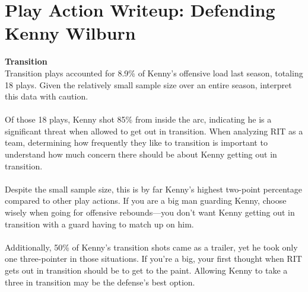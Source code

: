 \documentclass[a4paper,12pt]{article}
\begin{document}
\vspace{2em}

\section*{Play Action Writeup: Defending Kenny Wilburn}

\begin{multicols}{2}
    
    {\large \noindent \textbf{Transition}} \\ 
    Transition plays accounted for 8.9\% of Kenny's offensive load last season, totaling 18 plays. Given the relatively small sample size over an entire season, interpret this data with caution. \\ \\
    Of those 18 plays, Kenny shot 85\% from inside the arc, indicating he is a significant threat when allowed to get out in transition. When analyzing RIT as a team, determining how frequently they like to transition is important to understand how much concern there should be about Kenny getting out in transition. \\ \\
    Despite the small sample size, this is by far Kenny's highest two-point percentage compared to other play actions. If you are a big man guarding Kenny, choose wisely when going for offensive rebounds—you don't want Kenny getting out in transition with a guard having to match up on him. \\ \\
    Additionally, 50\% of Kenny's transition shots came as a trailer, yet he took only one three-pointer in those situations. If you're a big, your first thought when RIT gets out in transition should be to get to the paint. Allowing Kenny to take a three in transition may be the defense's best option.\vspace{1em} 
    

\end{multicols}
\end{document}
